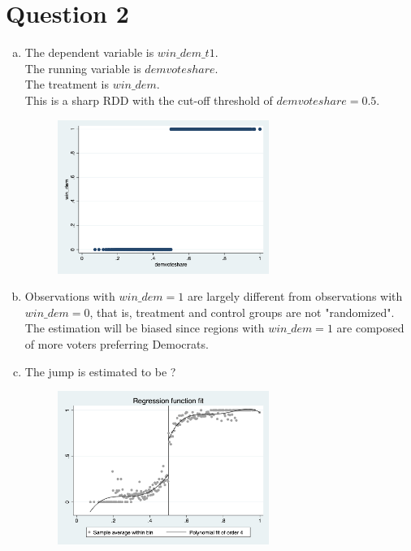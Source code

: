 \documentclass[12pt]{article}
\begin{document}
\section*{Question 2}
\begin{enumerate}[(a)]
    \item The dependent variable is $win\_dem\_t1$. \\ 
    The running variable is $demvoteshare$. \\ 
    The treatment is $win\_dem$. \\ 
    This is a sharp RDD with the cut-off threshold of $demvoteshare = 0.5$. \\ 
    \begin{figure}[H]
        \centering
        \includegraphics[width=0.65\textwidth]{RDD scatter.jpg}
    \end{figure}
    \item Observations with $win\_dem = 1$ are largely different from observations with $win\_dem = 0$, that is, treatment and control groups are not "randomized". 
    The estimation will be biased since regions with $win\_dem = 1$ are composed of more voters preferring Democrats.
    \item The jump is estimated to be {\color{red}?}
    \begin{figure}[H]
        \centering
        \includegraphics[width=0.65\textwidth]{RD plot.jpg}
    \end{figure}
\end{enumerate}
\end{document}
